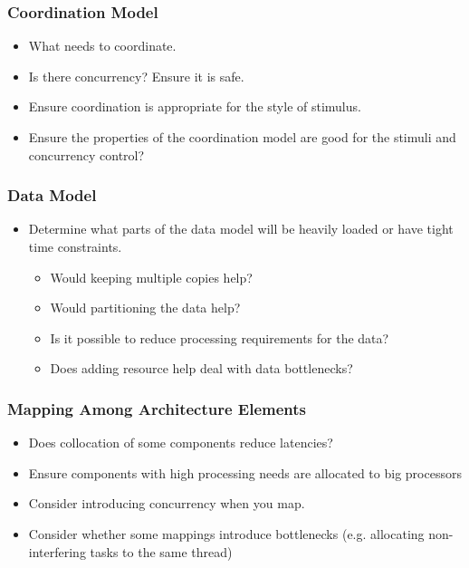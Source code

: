 \documentclass[a4paper]{article}
\begin{document}
\subsubsection{Coordination Model }
\begin{itemize}
\item{What needs to coordinate.}
\item{Is there concurrency?  Ensure it is safe.}
\item{Ensure coordination is appropriate for the style of stimulus.}
\item{Ensure the properties of the coordination model are good for the stimuli and concurrency control?}
\end{itemize}

\subsubsection{Data Model}
\begin{itemize}
\item Determine what parts of the data model will be heavily loaded or have tight time constraints.
\begin{itemize}
\item{Would keeping multiple copies help?}
\item{Would partitioning the data help?}
\item{Is it possible to reduce processing requirements for the data?}
\item{Does adding resource help deal with data bottlenecks?}
\end{itemize}
\end{itemize}

\subsubsection{Mapping Among Architecture Elements }
\begin{itemize}
\item{Does collocation of some components reduce latencies?}
\item{Ensure components with high processing needs are allocated to big processors}
\item{Consider introducing concurrency when you map.}
\item{Consider whether some mappings introduce bottlenecks (e.g. allocating non-interfering tasks to the same thread)}
\end{itemize}
\end{document}
